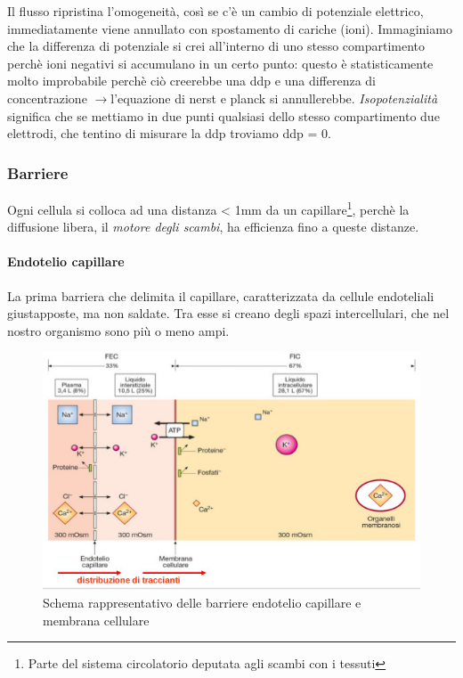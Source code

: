 \documentclass[a4paper,12pt]{article}
\newcommand{\lfreccia}{\ensuremath{\longrightarrow}}
\begin{document}
Il flusso ripristina l'omogeneità, così se c'è un cambio di potenziale elettrico, immediatamente viene annullato con spostamento di cariche (ioni). Immaginiamo che la differenza di potenziale si crei all'interno di uno stesso compartimento perchè ioni negativi si accumulano in un certo punto: questo è statisticamente molto improbabile perchè ciò creerebbe una ddp e una differenza di concentrazione \lfreccia l'equazione di nerst e planck si annullerebbe. \emph{Isopotenzialità} significa che se mettiamo in due punti qualsiasi dello stesso compartimento due elettrodi, che tentino di misurare la ddp troviamo ddp = 0.


\subsubsection{Barriere}
Ogni cellula si colloca ad una distanza < 1mm da un capillare\footnote{Parte del sistema circolatorio deputata agli scambi con i tessuti}, perchè la diffusione libera, il \emph{motore degli scambi}, ha efficienza fino a queste distanze.


\paragraph{Endotelio capillare}
La prima barriera che delimita il capillare, caratterizzata da cellule endoteliali giustapposte, ma non saldate. Tra esse si creano degli spazi intercellulari, che nel nostro organismo sono più o meno ampi.
\begin{figure}[H]
\centering
\includegraphics[scale=0.45]{immagine/endotelio.jpg}
\caption{Schema rappresentativo delle barriere endotelio capillare e membrana cellulare}
\label{img:endo}
\end{figure}
\end{document}
